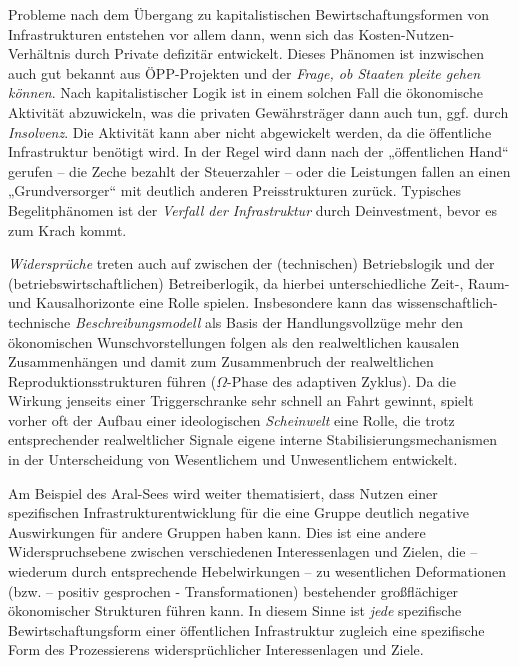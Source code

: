 \documentclass[11pt,a4paper]{article}
\begin{document}
Probleme nach dem Übergang zu kapitalistischen Bewirtschaftungsformen von
Infrastrukturen entstehen vor allem dann, wenn sich das
Kosten-Nutzen-Verhältnis durch Private defizitär entwickelt. Dieses Phänomen
ist inzwischen auch gut bekannt aus ÖPP-Projekten und der \emph{Frage, ob
  Staaten pleite gehen können}. Nach kapitalistischer Logik ist in einem
solchen Fall die ökonomische Aktivität abzuwickeln, was die privaten
Gewährsträger dann auch tun, ggf. durch \emph{Insolvenz}. Die Aktivität kann
aber nicht abgewickelt werden, da die öffentliche Infrastruktur benötigt
wird. In der Regel wird dann nach der „öffentlichen Hand“ gerufen -- die Zeche
bezahlt der Steuerzahler -- oder die Leistungen fallen an einen
„Grundversorger“ mit deutlich anderen Preisstrukturen zurück. Typisches
Begelitphänomen ist der \emph{Verfall der Infrastruktur} durch Deinvestment,
bevor es zum Krach kommt.

\emph{Widersprüche} treten auch auf zwischen der (technischen) Betriebslogik
und der (betriebswirtschaftlichen) Betreiberlogik, da hierbei unterschiedliche
Zeit-, Raum- und Kausalhorizonte eine Rolle spielen. Insbesondere kann das
wissenschaftlich-technische \emph{Beschreibungsmodell} als Basis der
Handlungsvollzüge mehr den ökonomischen Wunschvorstellungen folgen als den
realweltlichen kausalen Zusammenhängen und damit zum Zusammenbruch der
realweltlichen Reproduktionsstrukturen führen ($\Omega$-Phase des adaptiven
Zyklus). Da die Wirkung jenseits einer Triggerschranke sehr schnell an Fahrt
gewinnt, spielt vorher oft der Aufbau einer ideologischen \emph{Scheinwelt}
eine Rolle, die trotz entsprechender realweltlicher Signale eigene interne
Stabilisierungsmechanismen in der Unterscheidung von Wesentlichem und
Unwesentlichem entwickelt.

Am Beispiel des Aral-Sees wird weiter thematisiert, dass Nutzen einer
spezifischen Infrastrukturentwicklung für die eine Gruppe deutlich negative
Auswirkungen für andere Gruppen haben kann. Dies ist eine andere
Widerspruchsebene zwischen verschiedenen Interessenlagen und Zielen, die --
wiederum durch entsprechende Hebelwirkungen -- zu wesentlichen Deformationen
(bzw. -- positiv gesprochen - Transformationen) bestehender großflächiger
ökonomischer Strukturen führen kann. In diesem Sinne ist \emph{jede}
spezifische Bewirtschaftungsform einer öffentlichen Infrastruktur zugleich
eine spezifische Form des Prozessierens widersprüchlicher Interessenlagen und
Ziele.
\end{document}
